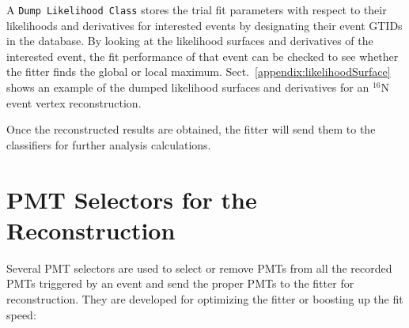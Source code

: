 A \texttt{Dump Likelihood Class} stores the trial fit parameters with respect to their likelihoods and derivatives for interested events by designating their event GTIDs in the database. By looking at the likelihood surfaces and derivatives of the interested event, the fit performance of that event can be checked to see whether the fitter finds the global or local maximum. Sect.~\ref{appendix:likelihoodSurface} shows an example of the dumped likelihood surfaces and derivatives for an $^{16}$N event vertex reconstruction. 

Once the reconstructed results are obtained, the fitter will send them to the classifiers for further analysis calculations. 

\section{PMT Selectors for the Reconstruction}\label{sect:PMTselector}
Several PMT selectors are used to select or remove PMTs from all the recorded PMTs triggered by an event and send the proper PMTs to the fitter for reconstruction. They are developed for optimizing the fitter or boosting up the fit speed:

